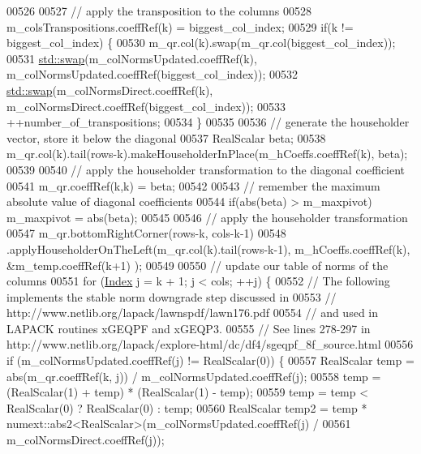 \begin{DoxyCode}
00526 
00527     \textcolor{comment}{// apply the transposition to the columns}
00528     m\_colsTranspositions.coeffRef(k) = biggest\_col\_index;
00529     \textcolor{keywordflow}{if}(k != biggest\_col\_index) \{
00530       m\_qr.col(k).swap(m\_qr.col(biggest\_col\_index));
00531       \hyperlink{endian_8c_a3ca5ecd34b04d6a243c054ac3a57f68d}{std::swap}(m\_colNormsUpdated.coeffRef(k), m\_colNormsUpdated.coeffRef(biggest\_col\_index));
00532       \hyperlink{endian_8c_a3ca5ecd34b04d6a243c054ac3a57f68d}{std::swap}(m\_colNormsDirect.coeffRef(k), m\_colNormsDirect.coeffRef(biggest\_col\_index));
00533       ++number\_of\_transpositions;
00534     \}
00535 
00536     \textcolor{comment}{// generate the householder vector, store it below the diagonal}
00537     RealScalar beta;
00538     m\_qr.col(k).tail(rows-k).makeHouseholderInPlace(m\_hCoeffs.coeffRef(k), beta);
00539 
00540     \textcolor{comment}{// apply the householder transformation to the diagonal coefficient}
00541     m\_qr.coeffRef(k,k) = beta;
00542 
00543     \textcolor{comment}{// remember the maximum absolute value of diagonal coefficients}
00544     \textcolor{keywordflow}{if}(abs(beta) > m\_maxpivot) m\_maxpivot = abs(beta);
00545 
00546     \textcolor{comment}{// apply the householder transformation}
00547     m\_qr.bottomRightCorner(rows-k, cols-k-1)
00548         .applyHouseholderOnTheLeft(m\_qr.col(k).tail(rows-k-1), m\_hCoeffs.coeffRef(k), &m\_temp.coeffRef(k+1)
      );
00549 
00550     \textcolor{comment}{// update our table of norms of the columns}
00551     \textcolor{keywordflow}{for} (\hyperlink{namespace_eigen_a62e77e0933482dafde8fe197d9a2cfde}{Index} j = k + 1; j < cols; ++j) \{
00552       \textcolor{comment}{// The following implements the stable norm downgrade step discussed in}
00553       \textcolor{comment}{// http://www.netlib.org/lapack/lawnspdf/lawn176.pdf}
00554       \textcolor{comment}{// and used in LAPACK routines xGEQPF and xGEQP3.}
00555       \textcolor{comment}{// See lines 278-297 in http://www.netlib.org/lapack/explore-html/dc/df4/sgeqpf\_8f\_source.html}
00556       \textcolor{keywordflow}{if} (m\_colNormsUpdated.coeffRef(j) != RealScalar(0)) \{
00557         RealScalar temp = abs(m\_qr.coeffRef(k, j)) / m\_colNormsUpdated.coeffRef(j);
00558         temp = (RealScalar(1) + temp) * (RealScalar(1) - temp);
00559         temp = temp <  RealScalar(0) ? RealScalar(0) : temp;
00560         RealScalar temp2 = temp * numext::abs2<RealScalar>(m\_colNormsUpdated.coeffRef(j) /
00561                                                            m\_colNormsDirect.coeffRef(j));

\end{DoxyCode}
